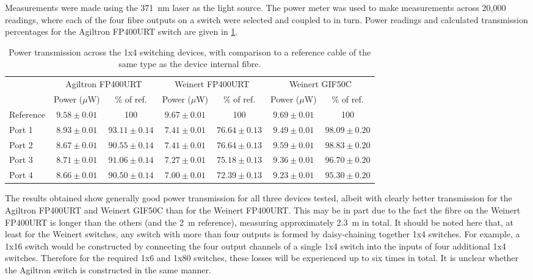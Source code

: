 \documentclass[a4paper,11pt]{article}
\begin{document}
Measurements were made using the 371~nm laser as the light source. The power meter was used to make measurements across 20,000 readings, where each of the four fibre outputs on a switch were selected and coupled to in turn. Power readings and calculated transmission percentages for the Agiltron FP400URT switch are given in \cref{tab:switchpower}.
\begin{table}[h]
\centering
\begin{tabular}{l|cc|cc|cc}
\toprule
\multirow{2}{*}{} & \multicolumn{2}{c|}{Agiltron FP400URT} & \multicolumn{2}{c|}{Weinert FP400URT} & \multicolumn{2}{c}{Weinert GIF50C} \\
			&	Power ($\mu$W) & \% of ref. & Power ($\mu$W) & \% of ref. & Power ($\mu$W) & \% of ref.\\ \midrule
Reference	& $9.58\pm0.01$	& 100  			 & $9.67\pm0.01$ & 100 			  & $9.69\pm0.01$ & 100 \\
Port 1		& $8.93\pm0.01$	& $93.11\pm0.14$ & $7.41\pm0.01$ & $76.64\pm0.13$ & $9.49\pm0.01$ & $98.09\pm0.20$ \\
Port 2		& $8.67\pm0.01$	& $90.55\pm0.14$ & $7.41\pm0.01$ & $76.64\pm0.13$ & $9.59\pm0.01$ & $98.83\pm0.20$ \\
Port 3		& $8.71\pm0.01$	& $91.06\pm0.14$ & $7.27\pm0.01$ & $75.18\pm0.13$ & $9.36\pm0.01$ & $96.70\pm0.20$ \\
Port 4		& $8.66\pm0.01$	& $90.50\pm0.14$ & $7.00\pm0.01$ & $72.39\pm0.13$ & $9.23\pm0.01$ & $95.30\pm0.20$ \\
\bottomrule
\end{tabular}
\caption{Power transmission across the 1x4 switching devices, with comparison to a reference cable of the same type as the device internal fibre.}\label{tab:switchpower}
\end{table}
The results obtained show generally good power transmission for all three devices tested, albeit with clearly better transmission for the Agiltron FP400URT and Weinert GIF50C than for the Weinert FP400URT. This may be in part due to the fact the fibre on the Weinert FP400URT is longer than the others (and the 2~m reference), measuring approximately 2.3~m in total. It should be noted here that, at least for the Weinert switches, any switch with more than four outputs is formed by daisy-chaining together 1x4 switches. For example, a 1x16 switch would be constructed by connecting the four output channels of a single 1x4 switch into the inputs of four additional 1x4 switches. Therefore for the required 1x6 and 1x80 switches, these losses will be experienced up to six times in total. It is unclear whether the Agiltron switch is constructed in the same manner.
\end{document}
